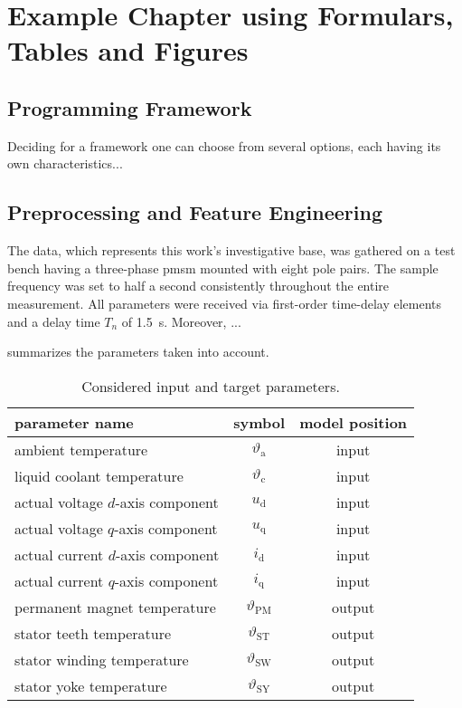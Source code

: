\chapter{Example Chapter using Formulars, Tables and Figures} 
\label{cha:derivation}

\section{Programming Framework}
\label{sec:framework}
Deciding for a framework one can choose from several options, each having its own characteristics...

\section{Preprocessing and Feature Engineering}
\label{sec:features}
The data, which represents this work's investigative base, was gathered on a test bench having a three-phase \gls{pmsm} mounted with eight pole pairs.
The sample frequency was set to half a second consistently throughout the entire measurement. 
All parameters were received via first-order time-delay elements and a delay time $T_n$ of \SI{1.5}{\second}.
Moreover, ...

 summarizes the parameters taken into account.
\begin{table}
	\caption{Considered input and target parameters.}
	\label{tab:params}
	\centering
	\begin{tabular}{l c c}
		\toprule
		parameter name & symbol & model position \\
		\midrule
		ambient temperature & $\vartheta_\mathrm{a}$ & input \\
		liquid coolant temperature & $\vartheta_\mathrm{c}$ & input \\
		actual voltage $d$-axis component & $u_\mathrm{d}$ & input \\
		actual voltage $q$-axis component & $u_\mathrm{q}$ & input \\
		actual current $d$-axis component & $i_\mathrm{d}$ & input \\
		actual current $q$-axis component & $i_\mathrm{q}$ & input \\
		\hline
		permanent magnet temperature & $\vartheta_{\mathrm{PM}}$ & output \\
		stator teeth temperature & $\vartheta_{\mathrm{ST}}$ & output \\
		stator winding temperature & $\vartheta_{\mathrm{SW}}$ & output \\
		stator yoke temperature & $\vartheta_{\mathrm{SY}}$ & output\\
		\bottomrule
	 \end{tabular}
\end{table}


